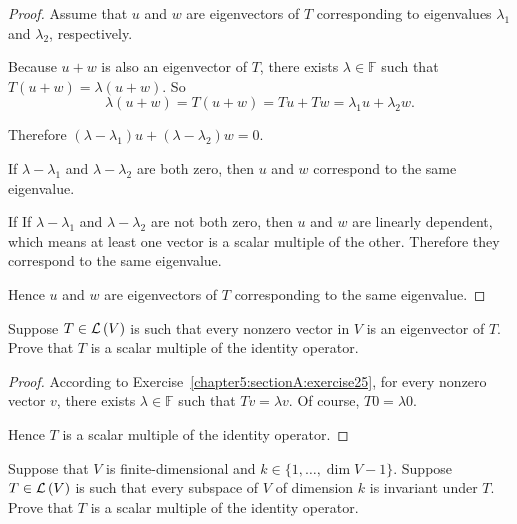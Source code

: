 \begin{proof}
    Assume that $u$ and $w$ are eigenvectors of $T$ corresponding to eigenvalues $\lambda_{1}$ and $\lambda_{2}$, respectively.

    Because $u + w$ is also an eigenvector of $T$, there exists $\lambda\in\mathbb{F}$ such that $T(u + w) = \lambda(u + w)$. So
    \[
        \lambda(u + w) = T(u + w) = Tu + Tw = \lambda_{1}u + \lambda_{2}w.
    \]

    Therefore $(\lambda - \lambda_{1})u + (\lambda - \lambda_{2})w = 0$.

    If $\lambda - \lambda_{1}$ and $\lambda - \lambda_{2}$ are both zero, then $u$ and $w$ correspond to the same eigenvalue.

    If If $\lambda - \lambda_{1}$ and $\lambda - \lambda_{2}$ are not both zero, then $u$ and $w$ are linearly dependent, which means at least one vector is a scalar multiple of the other. Therefore they correspond to the same eigenvalue.

    Hence $u$ and $w$ are eigenvectors of $T$ corresponding to the same eigenvalue.
\end{proof}
\newpage

\begin{exercise}\label{chapter5:sectionA:exercise26}
    Suppose $T \in \mathcal{L}\left({V}\right)$ is such that every nonzero vector in $V$ is an eigenvector of $T$. Prove that $T$ is a scalar multiple of the identity operator.
\end{exercise}

\begin{proof}
    According to Exercise~\ref{chapter5:sectionA:exercise25}, for every nonzero vector $v$, there exists $\lambda\in\mathbb{F}$ such that $Tv = \lambda v$. Of course, $T0 = \lambda 0$.

    Hence $T$ is a scalar multiple of the identity operator.
\end{proof}
\newpage

\begin{exercise}
    Suppose that $V$ is finite-dimensional and $k \in \{1, \ldots, \dim V - 1\}$. Suppose $T \in \mathcal{L}\left({V}\right)$ is such that every subspace of $V$ of dimension $k$ is invariant under $T$. Prove that $T$ is a scalar multiple of the identity operator.
\end{exercise}

